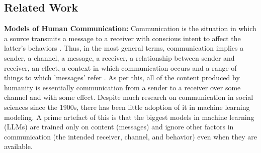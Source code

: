 
\subsection{Related Work}

\textbf{Models of Human Communication:}
Communication is the situation in which a source transmits a message to a receiver with conscious intent to affect the latter’s behaviors \cite{osgood1957measurement,miller1966defining}. Thus, in the most general terms, communication implies a sender, a channel, a message, a receiver, a relationship between sender and receiver, an effect, a context in which communication occurs and a range of things to which 'messages' refer \cite{mcquail2015communication,lasswell1948structure}. As per this, all of the content produced by humanity is essentially communication from a sender to a receiver over some channel and with some effect. Despite much research on communication in social sciences since the 1900s, there has been little adoption of it in machine learning modeling. A prime artefact of this is that the biggest models in machine learning (LLMs) are trained only on content (messages) and ignore other factors in communication (the intended receiver, channel, and behavior) even when they are available.


